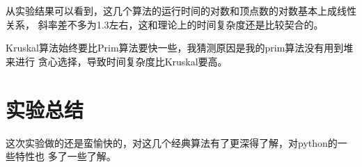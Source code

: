 \documentclass[12pt]{article}
\begin{document}
从实验结果可以看到，这几个算法的运行时间的对数和顶点数的对数基本上成线性关系，
斜率差不多为1.3左右，这和理论上的时间复杂度还是比较契合的。

\medskip

Kruskal算法始终要比Prim算法要快一些，我猜测原因是我的prim算法没有用到堆来进行
贪心选择，导致时间复杂度比Kruskal要高。

\section*{实验总结}

这次实验做的还是蛮愉快的，对这几个经典算法有了更深得了解，对python的一些特性也
多了一些了解。
\end{document}
